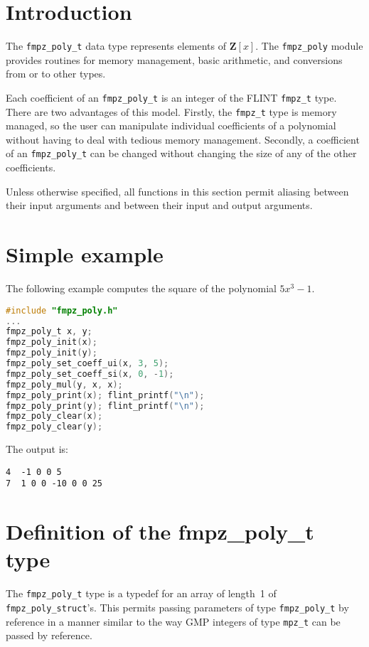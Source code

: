 \documentclass[a4paper,10pt]{book}
\newcommand{\Z}{\mathbf{Z}}%
\newcommand{\code}{\lstinline}
\begin{document}
{{\section{Introduction}

The \code{fmpz_poly_t} data type represents elements of $\Z[x]$. The
\code{fmpz_poly} module provides routines for memory management, basic
arithmetic, and conversions from or to other types.

Each coefficient of an \code{fmpz_poly_t} is an integer of the FLINT
\code{fmpz_t} type.  There are two advantages of this model.  Firstly,
the \code{fmpz_t} type is memory managed, so the user can manipulate
individual coefficients of a polynomial without having to deal with
tedious memory management.  Secondly, a coefficient of an
\code{fmpz_poly_t} can be changed without changing the size of any
of the other coefficients.

Unless otherwise specified, all functions in this section permit aliasing
between their input arguments and between their input and output arguments.

\section{Simple example}

The following example computes the square of the polynomial $5x^3 - 1$.
\begin{lstlisting}[language=c]
#include "fmpz_poly.h"
...
fmpz_poly_t x, y;
fmpz_poly_init(x);
fmpz_poly_init(y);
fmpz_poly_set_coeff_ui(x, 3, 5);
fmpz_poly_set_coeff_si(x, 0, -1);
fmpz_poly_mul(y, x, x);
fmpz_poly_print(x); flint_printf("\n");
fmpz_poly_print(y); flint_printf("\n");
fmpz_poly_clear(x);
fmpz_poly_clear(y);
\end{lstlisting}

The output is:
\begin{lstlisting}
4  -1 0 0 5
7  1 0 0 -10 0 0 25
\end{lstlisting}

\section{Definition of the fmpz\_poly\_t type}

The \code{fmpz_poly_t} type is a typedef for an array of length~1 of
\code{fmpz_poly_struct}'s.  This permits passing parameters of type
\code{fmpz_poly_t} by reference in a manner similar to the way GMP integers
of type \code{mpz_t} can be passed by reference.

}}
\end{document}

